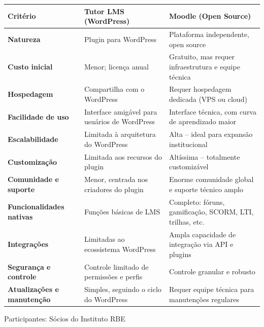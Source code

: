 \documentclass[12pt, a4paper]{letter} %
\begin{document}
\begin{longtable}{|p{3cm}|p{5cm}|p{6cm}|}
	\hline
	\textbf{Critério}                  & \textbf{Tutor LMS (WordPress)}                & \textbf{Moodle (Open Source)}                            \\
	\hline
	\endhead %
	\textbf{Natureza}                  & Plugin para WordPress                         & Plataforma independente, open source                     \\
	\hline
	\textbf{Custo inicial}             & Menor; licença anual                          & Gratuito, mas requer infraestrutura e equipe técnica     \\
	\hline
	\textbf{Hospedagem}                & Compartilha com o WordPress                   & Requer hospedagem dedicada (VPS ou cloud)                \\
	\hline
	\textbf{Facilidade de uso}         & Interface amigável para usuários de WordPress & Interface técnica, com curva de aprendizado maior        \\
	\hline
	\textbf{Escalabilidade}            & Limitada à arquitetura do WordPress           & Alta – ideal para expansão institucional                 \\
	\hline
	\textbf{Customização}              & Limitada aos recursos do plugin               & Altíssima – totalmente customizável                      \\
	\hline
	\textbf{Comunidade e suporte}      & Menor, centrada nos criadores do plugin       & Enorme comunidade global e suporte técnico amplo         \\
	\hline
	\textbf{Funcionalidades nativas}   & Funções básicas de LMS                        & Completo: fóruns, gamificação, SCORM, LTI, trilhas, etc. \\
	\hline
	\textbf{Integrações}               & Limitadas ao ecossistema WordPress            & Ampla capacidade de integração via API e plugins         \\
	\hline
	\textbf{Segurança e controle}      & Controle limitado de permissões e perfis      & Controle granular e robusto                              \\
	\hline
	\textbf{Atualizações e manutenção} & Simples, seguindo o ciclo do WordPress        & Requer equipe técnica para manutenções regulares         \\
	\hline
\end{longtable}



Participantes: Sócios do Instituto RBE
\end{document}

